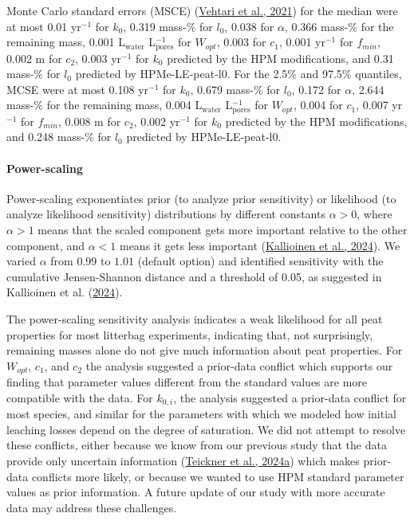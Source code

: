 \documentclass[
  12pt,
]{article}
\begin{document}
Monte Carlo standard errors (MSCE) (\protect\hyperlink{ref-Vehtari.2021}{Vehtari et al., 2021}) for the median were at most 0.01 yr\(^{-1}\) for \(k_0\), 0.319 mass-\% for \(l_0\), 0.038 for \(\alpha\), 0.366 mass-\% for the remaining mass, 0.001 L\(_\text{water}\) L\(_\text{pores}^{-1}\) for \(W_{opt}\), 0.003 for \(c_{1}\), 0.001 yr\(^{-1}\) for \(f_{min}\), 0.002 m for \(c_{2}\), 0.003 yr\(^{-1}\) for \(k_0\) predicted by the HPM modifications, and 0.31 mass-\% for \(l_0\) predicted by HPMe-LE-peat-l0. For the 2.5\% and 97.5\% quantiles, MCSE were at most 0.108 yr\(^{-1}\) for \(k_0\), 0.679 mass-\% for \(l_0\), 0.172 for \(\alpha\), 2.644 mass-\% for the remaining mass, 0.004 L\(_\text{water}\) L\(_\text{pores}^{-1}\) for \(W_{opt}\), 0.004 for \(c_{1}\), 0.007 yr\(^{-1}\) for \(f_{min}\), 0.008 m for \(c_{2}\), 0.002 yr\(^{-1}\) for \(k_0\) predicted by the HPM modifications, and 0.248 mass-\% for \(l_0\) predicted by HPMe-LE-peat-l0.

\hypertarget{power-scaling}{%
\paragraph*{Power-scaling}\label{power-scaling}}

Power-scaling exponentiates prior (to analyze prior sensitivity) or likelihood (to analyze likelihood sensitivity) distributions by different constants \(\alpha>0\), where \(\alpha>1\) means that the scaled component gets more important relative to the other component, and \(\alpha<1\) means it gets less important (\protect\hyperlink{ref-Kallioinen.2024}{Kallioinen et al., 2024}). We varied \(\alpha\) from \(0.99\) to \(1.01\) (default option) and identified sensitivity with the cumulative Jensen-Shannon distance and a threshold of 0.05, as suggested in Kallioinen et al. (\protect\hyperlink{ref-Kallioinen.2024}{2024}).

The power-scaling sensitivity analysis indicates a weak likelihood for all peat properties for most litterbag experiments, indicating that, not surprisingly, remaining masses alone do not give much information about peat properties. For \(W_{opt}\), \(c_{1}\), and \(c_{2}\) the analysis suggested a prior-data conflict which supports our finding that parameter values different from the standard values are more compatible with the data. For \(k_{0,i}\), the analysis suggested a prior-data conflict for most species, and similar for the parameters with which we modeled how initial leaching losses depend on the degree of saturation. We did not attempt to resolve these conflicts, either because we know from our previous study that the data provide only uncertain information (\protect\hyperlink{ref-Teickner.2024}{Teickner et al., 2024a}) which makes prior-data conflicts more likely, or because we wanted to use HPM standard parameter values as prior information. A future update of our study with more accurate data may address these challenges.
\end{document}
